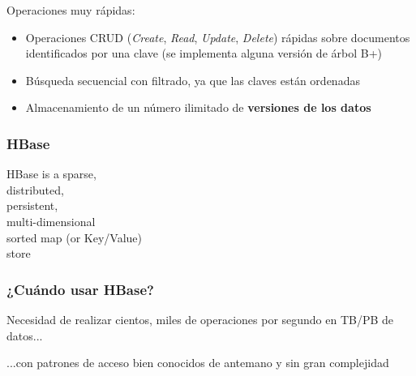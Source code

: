 \documentclass[14pt]{beamer}
\begin{document}
\begin{frame}[allowframebreaks]
\framebreak

 Operaciones muy rápidas:
  \begin{itemize}
  \item Operaciones CRUD ({\em Create}, {\em Read}, {\em Update}, {\em
      Delete}) rápidas sobre documentos identificados por una clave (se
    implementa alguna versión de árbol B+)
\item Búsqueda secuencial con filtrado, ya que las claves están ordenadas
\item Almacenamiento de un número ilimitado de {\bf versiones de los datos}
  \end{itemize}

\end{frame}

\begin{frame}
  \frametitle{HBase}
  \begin{block}{}
    {\Large  HBase is a {\color{red} sparse},\\ {\color{green} distributed},\\
      {\color{blue} persistent},\\ {\color{red} multi-dimensional} \\
      {\color{green} sorted map} (or Key/Value) \\ {\color{blue} store}}
  \end{block}
\end{frame}

\begin{frame}
  \frametitle{¿Cuándo usar HBase?}

  \begin{block}{}
    Necesidad de realizar cientos, miles de operaciones por segundo en
    TB/PB de datos...
  \end{block}

  \begin{block}{}
    ...con patrones de acceso bien conocidos de antemano y sin gran
    complejidad
  \end{block}

\end{frame}
\end{document}
